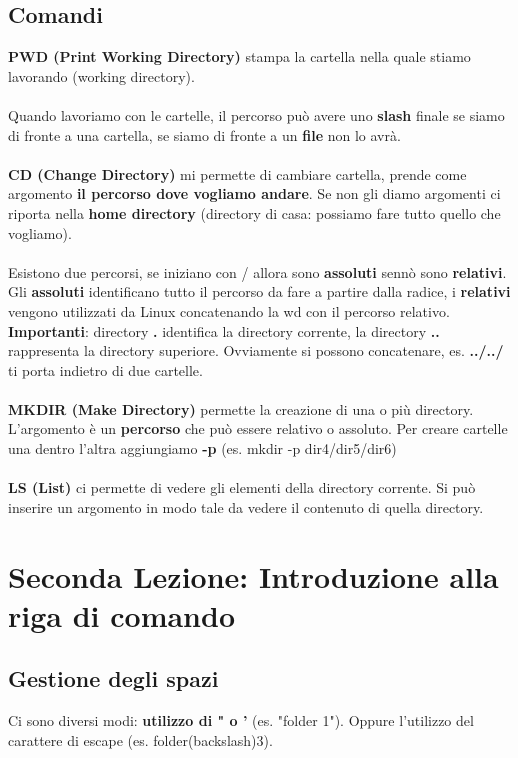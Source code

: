 \documentclass{article}
\begin{document}
\subsection{Comandi}
\textbf{PWD (Print Working Directory)} stampa la cartella nella quale stiamo lavorando (working directory).\\\\
Quando lavoriamo con le cartelle, il percorso può avere uno \textbf{slash} finale se siamo di fronte a una cartella, se siamo di fronte a un \textbf{file} non lo avrà.\\\\
\textbf{CD (Change Directory)} mi permette di cambiare cartella, prende come argomento \textbf{il percorso dove vogliamo andare}. Se non gli diamo argomenti ci riporta nella \textbf{home directory} (directory di casa: possiamo fare tutto quello che vogliamo).\\\\
Esistono due percorsi, se iniziano con / allora sono \textbf{assoluti} sennò sono \textbf{relativi}. Gli \textbf{assoluti} identificano tutto il percorso da fare a partire dalla radice, i \textbf{relativi} vengono utilizzati da Linux concatenando la wd con il percorso relativo. \textbf{Importanti}: directory \textbf{.} identifica la directory corrente, la directory \textbf{..} rappresenta la directory superiore. Ovviamente si possono concatenare, es. \textbf{../../} ti porta indietro di due cartelle.\\\\
\textbf{MKDIR (Make Directory)} permette la creazione di una o più directory. L'argomento è un \textbf{percorso} che può essere relativo o assoluto. Per creare cartelle una dentro l'altra aggiungiamo \textbf{-p} (es. mkdir -p dir4/dir5/dir6)\\\\
\textbf{LS (List)} ci permette di vedere gli elementi della directory corrente. Si può inserire un argomento in modo tale da vedere il contenuto di quella directory.
\section{Seconda Lezione: Introduzione alla riga di comando}
\subsection{Gestione degli spazi}
Ci sono diversi modi: \textbf{utilizzo di " o '} (es. "folder 1"). Oppure l'utilizzo del carattere di escape (es. folder(backslash)3).
\end{document}
